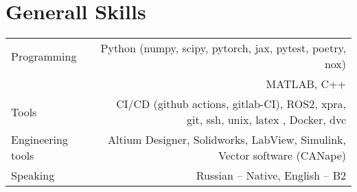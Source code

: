\section*{Generall Skills}
\vspace{-0.5em}
\begin{tabular}{@{}L!{\VRule}R}
    Programming       & Python (numpy, scipy, pytorch, jax, pytest, poetry, nox)                           \\
                      & MATLAB, C++                                                                        \\
    Tools             & CI/CD (github actions, gitlab-CI), ROS2, xpra, git, ssh, unix, latex , Docker, dvc \\
    Engineering tools & Altium Designer, Solidworks, LabView, Simulink, Vector software (CANape)           \\
    Speaking          & Russian -- Native, English -- B2                                                   \\
\end{tabular}